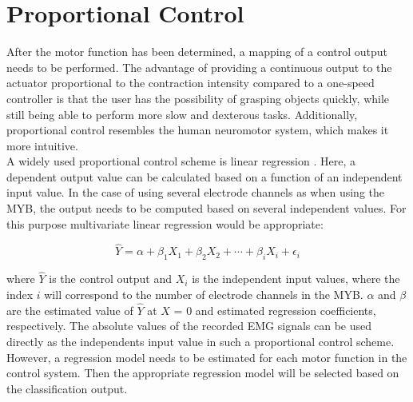 \section{Proportional Control}
After the motor function has been determined, a mapping of a control output needs to be performed. The advantage of providing a continuous output to the actuator proportional to the contraction intensity compared to a one-speed controller is that the user has the possibility of grasping objects quickly, while still being able to perform more slow and dexterous tasks. Additionally, proportional control resembles the human neuromotor system, which makes it more intuitive. \cite{Fougner2012} \\
A widely used proportional control scheme is linear regression \cite{Fougner2012}. Here, a dependent output value can be calculated based on a function of an independent input value. In the case of using several electrode channels as when using the MYB, the output needs to be computed based on several independent values. For this purpose multivariate linear regression would be appropriate:

\begin{equation}
	\hat{Y} = \alpha+\beta_{1}X_{1}+\beta_{2}X_{2}+\cdots+\beta_{i}X_{i}+\epsilon_{i}
\end{equation}

where $\hat{Y}$ is the control output and $X_{i}$ is the independent input values, where the index $i$ will correspond to the number of electrode channels in the MYB. $\alpha$ and $\beta$ are the estimated value of $\hat{Y}$ at $X$ = 0 and estimated regression coefficients, respectively. The absolute values of the recorded EMG signals can be used directly as the independents input value in such a proportional control scheme. \cite{Zar2009} However, a regression model needs to be estimated for each motor function in the control system. Then the appropriate regression model will be selected based on the classification output.  